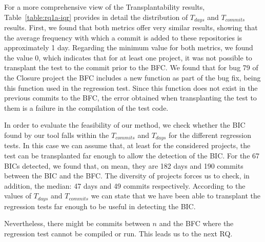 

For a more comprehensive view of the Transplantability results, Table~\ref{table:rq1a-iqr} provides in detail the distribution of $T_{days}$ and $T_{commits}$ results.
First, we found that both metrics offer very similar results, showing that the average frequency with which a commit is added to these repositories is approximately 1 day. 
Regarding the minimum value for both metrics, we found the value 0, which indicates that for at least one project, it was not possible to transplant the test to the commit prior to the BFC. We found that for bug 79 of the Closure project the BFC includes a new function as part of the bug fix, being this function used in the regression test. Since this function does not exist in the previous commits to the BFC, the error obtained when transplanting the test to them is a failure in the compilation of the test code.



In order to evaluate the feasibility of our method, we check whether the BIC found by our tool falls within the $T_{commits}$ and $T_{days}$ for the different regression tests. In this case we can assume that, at least for the considered projects, the test can be transplanted far enough to allow the detection of the BIC. 
For the 67 BICs detected, we found that, on mean, they are 182 days  and 190 commits between the BIC and the BFC. 
The diversity of projects forces us to check, in addition, the median: 47 days and 49 commits respectively. 
According to the values of $T_{days}$ and $T_{commits}$ we can state that we have been able to transplant the regression tests far enough to be useful in detecting the BIC. 

Nevertheless, there might be commits between $n$ and the BFC where the regression test cannot be compiled or run. This leads us to the next RQ.

